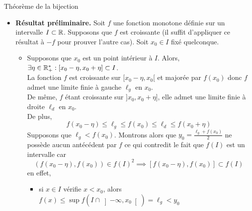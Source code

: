 \documentclass{article}
\renewenvironment{question_kholle}[2][ ]
{
	\subsection{\texorpdfstring{#2}{}}
	\notblank{#1}
	{
		\noindent #1
		\bigbreak
	}
	{}
	\begin{proof}
}
{
	\end{proof}
}
\begin{document}
\begin{question_kholle}
	{Théorème de la bijection}
	\hfill\\
	\begin{itemize}[label=$\vartriangleright$]
		\item \textbf{Résultat préliminaire.} Soit $f$ une fonction monotone définie sur un intervalle $I\subset\mathbb R$.
		      Supposons que $f$ est croissante (il suffit d’appliquer ce résultat à $-f$ pour prouver l’autre cas). Soit $x_{0}\in I$ fixé quelconque.\\
		      \begin{itemize}[label=$\star$]
			      \item
			            Supposons que $x_{0}$ est un point intérieur à $I$. Alors, $\exists\eta\in\mathbb R_{+}^{*}: [x_{0}-\eta,x_{0}+\eta]\subset I$.\\
			            La fonction $f$ est croissante sur $[x_{0}-\eta,x_{0}[$ et majorée par $f(x_{0})$ donc $f$ admet une limite finie à gauche $\ell_{g}$ en $x_{0}$.\\
			            De même, $f$ étant croissante sur $]x_{0}, x_{0}+\eta]$, elle admet une limite finie à droite $\ell_{d}$ en $x_{0}$.\\
			            De plus,
			            \begin{equation*}
				            f(x_{0}-\eta)\leq \ell_{g} \leq f(x_{0})\leq \ell_{d} \leq f(x_{0}+\eta)
			            \end{equation*}
			            Supposons que $\ell_{g}<f(x_{0})$. Montrons alors que $y_{0}=\frac{\ell_{g}+f(x_{0})}{2}$ ne possède aucun antécédent par $f$ ce qui contredit le fait que $f(I)$ est un intervalle car
			            \begin{equation*}
				            \left(f(x_{0}-\eta), f(x_{0})\right)\in f(I)^{2} \implies  \left[f(x_{0}-\eta), f(x_{0})\right]\subset f(I)
			            \end{equation*}
			            en effet,
			            \begin{itemize}
				            \item si $x\in I$ vérifie $x<x_{0}$, alors $f(x)\leq \sup f(I\cap \left]-\infty,x_{0}\right[)=\ell_{g}<y_{0}$

\end{itemize}
\end{itemize}
\end{itemize}
\end{question_kholle}
\end{document}
